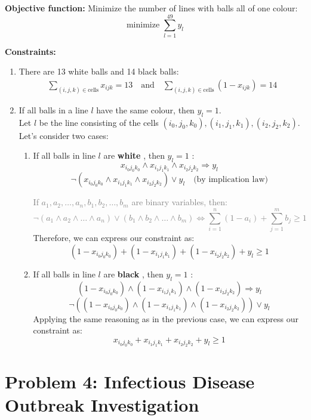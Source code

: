 \documentclass[a4paper,10pt]{article}
\begin{document}
\textbf{Objective function:}
Minimize the number of lines with balls all of one colour:
\[\text{minimize } \sum_{l=1}^{49} y_l\]

\textbf{Constraints:}

\begin{enumerate}
  \item There are 13 white balls and 14 black balls:
  \begin{align}
  \boxed{\sum_{(i,j,k) \in \text{cells}} x_{ijk} = 13} \quad \text{and} \quad 
  \boxed{\sum_{(i,j,k) \in \text{cells}} (1 - x_{ijk}) = 14}
  \end{align}
  \item If all balls in a line \(l\) have the same colour, then \(y_l = 1\).\\
  Let \(l\) be the line consisting of the cells \((i_0,j_0,k_0), (i_1,j_1,k_1), (i_2,j_2,k_2)\).
  Let's consider two cases:
  \begin{enumerate}
    \item If all balls in line \(l\) are \textbf{white} , then \(y_l=1\) :
      \[x_{i_0 j_0 k_0} \land x_{i_1 j_1 k_1} \land x_{i_2 j_2 k_2} \Rightarrow y_l\]
      \[\lnot (x_{i_0 j_0 k_0} \land x_{i_1 j_1 k_1} \land x_{i_2 j_2 k_2}) \lor y_l \quad \text{(by implication law)}\]

      \textcolor{gray}{If \(a_1, a_2, \dots, a_n, b_1, b_2, \dots, b_m\) are binary variables, then:
        \[
          \lnot (a_1 \land a_2 \land \dots \land a_n) \lor (b_1 \land b_2 \land \dots \land b_m) \Leftrightarrow \sum_{i=1}^{n} (1 - a_i) + \sum_{j=1}^{m} b_j \geq 1
        \]}
      Therefore, we can express our constraint as:
      \[\boxed{(1 - x_{i_0 j_0 k_0}) + (1 - x_{i_1 j_1 k_1}) + (1 - x_{i_2 j_2 k_2}) + y_l \geq 1}\]
    
      \item If all balls in line \(l\) are \textbf{black} , then \(y_l=1\) :
      \[(1 - x_{i_0 j_0 k_0}) \land (1 - x_{i_1 j_1 k_1}) \land (1 - x_{i_2 j_2 k_2}) \Rightarrow y_l\]
      \[
        \lnot ((1 - x_{i_0 j_0 k_0}) \land (1 - x_{i_1 j_1 k_1}) \land (1 - x_{i_2 j_2 k_2})) \lor y_l
      \]
      Applying the same reasoning as in the previous case, we can express our constraint as:
      \[\boxed{x_{i_0 j_0 k_0} + x_{i_1 j_1 k_1} + x_{i_2 j_2 k_2} + y_l \geq 1}\]
  \end{enumerate}
\end{enumerate}

\newpage

\section*{Problem 4: Infectious Disease Outbreak Investigation}
\end{document}
